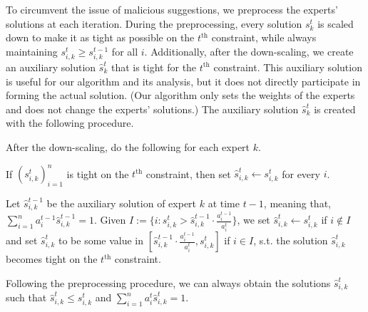 To circumvent the issue of malicious suggestions, we preprocess the experts' solutions at each iteration. During the preprocessing, every solution $s_k^t$ is scaled down to make it as tight as possible on the $t^{\text{th}}$ constraint, while always maintaining $s_{i,k}^{t} \geq s_{i,k}^{t-1}$ for all $i$. Additionally, after the down-scaling, we create an auxiliary solution $\hat{s}_k^t$ that is tight for the $t^{\text{th}}$ constraint. This auxiliary solution is useful for our algorithm and its analysis, but it does not directly participate in forming the actual solution. (Our algorithm only sets the weights of the experts and does not change the experts' solutions.) The auxiliary solution $\hat{s}_k^t$ is created with the following procedure.

After the down-scaling, do the following for each expert $k$.
\begin{compactenum}
	\item If $(s_{i,k}^{t})_{i=1}^{n}$ is tight on the $t^{\text{th}}$ constraint, then set $\hat{s}_{i,k}^{t} \gets s_{i,k}^{t}$  for every $i$.
	\item Let $\hat{s}_{i,k}^{t-1}$ be the auxiliary solution of expert $k$ at time $t-1$, meaning that, $\sum_{i=1}^{n} a_{i}^{t-1} \hat{s}_{i,k}^{t-1} = 1$. Given $I := \{i: s_{i,k}^{t} > \hat{s}_{i,k}^{t-1} \cdot \frac{a_{i}^{t-1}}{a_{i}^{t}} \}$, we set $\hat{s}_{i,k}^{t} \gets s_{i,k}^{t}$ if $i \notin I$
	and set $\hat{s}_{i,k}^{t}$ to be some value in $[\hat{s}_{i,k}^{t-1} \cdot \frac{a_{i}^{t-1}}{a_{i}^{t}}, s_{i,k}^{t}]$ if $i \in I$, s.t. the solution $\hat{s}_{i,k}^{t}$
	becomes tight on the $t^{\text{th}}$ constraint.
\end{compactenum}
%
\begin{lemma}
Following the preprocessing procedure, we can always obtain the solutions $\hat{s}_{i,k}^{t}$ such that
$\hat{s}_{i,k}^{t} \leq s_{i,k}^{t}$ and $\sum_{i=1}^{n} a_{i}^{t} \hat{s}_{i,k}^{t} = 1$.
\end{lemma}
%
